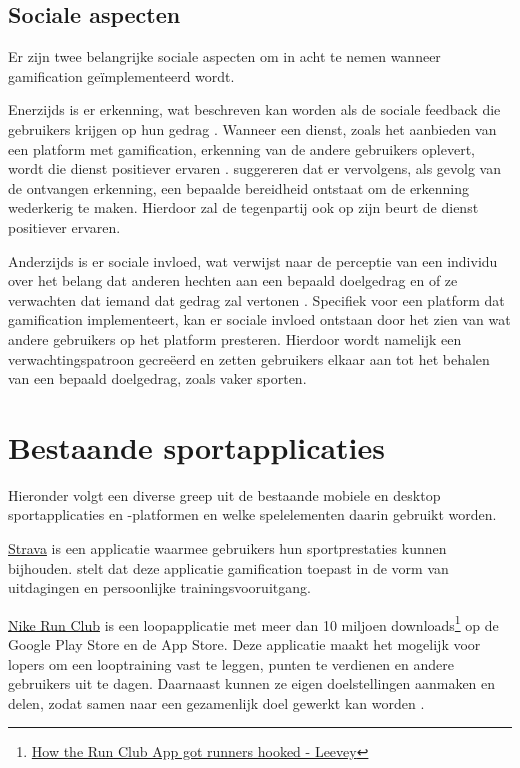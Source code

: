 \subsection{Sociale aspecten}
Er zijn twee belangrijke sociale aspecten om in acht te nemen wanneer gamification geïmplementeerd wordt.

Enerzijds is er erkenning, wat beschreven kan worden als de sociale feedback die gebruikers krijgen op hun gedrag \autocite{Cheung2011}.
Wanneer een dienst, zoals het aanbieden van een platform met gamification, erkenning van de andere gebruikers oplevert, wordt die dienst positiever ervaren \autocite{Preece2001}.
\textcite{Hamari2013} suggereren dat er vervolgens, als gevolg van de ontvangen erkenning, een bepaalde bereidheid ontstaat om de erkenning wederkerig te maken. Hierdoor zal de tegenpartij ook op zijn beurt de dienst positiever ervaren.

Anderzijds is er sociale invloed, wat verwijst naar de perceptie van een individu over het belang dat anderen hechten aan een bepaald doelgedrag en of ze verwachten dat iemand dat gedrag zal vertonen \autocite{Ajzen1991}. Specifiek voor een platform dat gamification implementeert, kan er sociale invloed ontstaan door het zien van wat andere gebruikers op het platform presteren. Hierdoor wordt namelijk een verwachtingspatroon gecreëerd en zetten gebruikers elkaar aan tot het behalen van een bepaald doelgedrag, zoals vaker sporten.

\section{Bestaande sportapplicaties}
Hieronder volgt een diverse greep uit de bestaande mobiele en desktop sportapplicaties en -platformen en welke spelelementen daarin gebruikt worden.

\href{https://www.strava.com/}{Strava} is een applicatie waarmee gebruikers hun sportprestaties kunnen bijhouden. \textcite{Barratt2017} stelt dat deze applicatie gamification toepast in de vorm van uitdagingen en persoonlijke trainingsvooruitgang.

\href{https://www.nike.com/be/en/nrc-app}{Nike Run Club} is een loopapplicatie met meer dan 10 miljoen downloads\footnote{\href{https://bootcamp.uxdesign.cc/how-the-nike-run-club-app-got-runners-hooked-2850c7654fc5}{How the Run Club App got runners hooked - Leevey}} op de Google Play Store en de App Store. Deze applicatie maakt het mogelijk voor lopers om een looptraining vast te leggen, punten te verdienen en andere gebruikers uit te dagen. Daarnaast kunnen ze eigen doelstellingen aanmaken en delen, zodat samen naar een gezamenlijk doel gewerkt kan worden \autocite{StaalnackeLarsson2013}.

